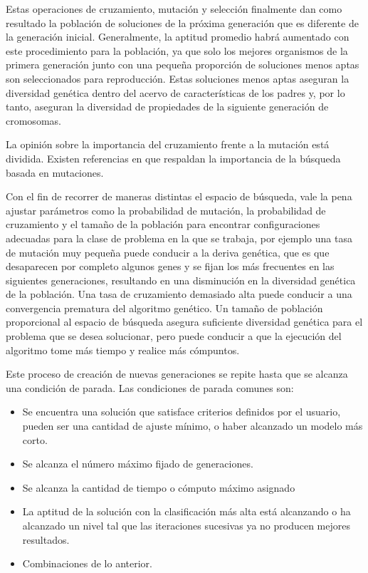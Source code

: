 Estas operaciones de cruzamiento, mutación y selección finalmente dan como resultado la población de soluciones de la próxima generación que es diferente de la generación inicial. Generalmente, la aptitud promedio habrá aumentado con este procedimiento para la población, ya que solo los mejores organismos de la primera generación junto con una pequeña proporción de soluciones menos aptas son seleccionados para reproducción. Estas soluciones menos aptas aseguran la diversidad genética dentro del acervo de características de los padres y, por lo tanto, aseguran la diversidad de propiedades de la siguiente generación de cromosomas.

La opinión sobre la importancia del cruzamiento frente a la mutación está dividida. Existen referencias en \cite{fogel2006evolutionary} que respaldan la importancia de la búsqueda basada en mutaciones.

Con el fin de recorrer de maneras distintas el espacio de búsqueda, vale la pena ajustar parámetros como la probabilidad de mutación, la probabilidad de cruzamiento y el tamaño de la población para encontrar configuraciones adecuadas para la clase de problema en la que se trabaja, por ejemplo una tasa de mutación muy pequeña puede conducir a la deriva genética, que es que desaparecen por completo algunos genes y se fijan los más frecuentes en las siguientes generaciones, resultando en una disminución en la diversidad genética de la población. Una tasa de cruzamiento demasiado alta puede conducir a una convergencia prematura del algoritmo genético. Un tamaño de población proporcional al espacio de búsqueda asegura suficiente diversidad genética para el problema que se desea solucionar, pero puede conducir a que la ejecución del algoritmo tome más tiempo y realice más cómpuntos.

Este proceso de creación de nuevas generaciones se repite hasta que se alcanza una condición de parada. Las condiciones de parada comunes son:

\begin{itemize}
    \item Se encuentra una solución que satisface criterios definidos por el usuario, pueden ser una cantidad de ajuste mínimo, o haber alcanzado un modelo más corto.
    \item Se alcanza el número máximo fijado de generaciones.
    \item Se alcanza la cantidad de tiempo o cómputo máximo asignado
    \item La aptitud de la solución con la clasificación más alta está alcanzando o ha alcanzado un nivel tal que las iteraciones sucesivas ya no producen mejores resultados.
    \item Combinaciones de lo anterior.
\end{itemize}

